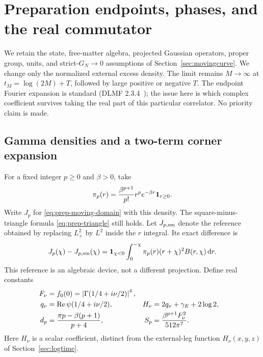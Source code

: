 \section{Preparation endpoints, phases, and the real commutator}
\label{sec:densityendpoints}
We retain the state, free-matter algebra, projected Gaussian operators,
proper group, units, and strict-$G_N\to0$ assumptions of
Section~\ref{sec:movingcurve}. We change only the normalized external
excess density. The limit remains $M\to\infty$ at
$t_M=\log(2M)+T$, followed by large positive or negative $T$.
The endpoint Fourier expansion is standard (DLMF 2.3.4~\cite{DLMF}); the issue here
is which complex coefficient survives taking the real part of this
particular correlator. No priority claim is made.

\subsection{Gamma densities and a two-term corner expansion}
For a fixed integer $p\ge0$ and $\beta>0$, take
\begin{equation}
 \pi_p(r)=\frac{\beta^{p+1}}{p!}r^pe^{-\beta r}\mathbf 1_{r\ge0}.
 \label{eq:dep-density}
\end{equation}
Write $J_p$ for \eqref{eq:prep-moving-domain} with this density.
The square-minus-triangle formula \eqref{eq:prep-triangle} still holds.
Let $J_{p,\rm sm}$ denote the reference obtained by replacing $L_+^2$
by $L^2$ inside the $r$ integral. Its exact difference is
\begin{equation}
 J_p(\chi)-J_{p,\rm sm}(\chi)
 =\mathbf 1_{\chi<0}\int_0^{-\chi}\pi_p(r)(r+\chi)^2 B(r,\chi)\mathop{}\!\mathrm d r.
 \label{eq:dep-difference}
\end{equation}
This reference is an algebraic device, not a different projection.
Define real constants
\begin{align}
 F_\nu&=f_0(0)=\left|\Gamma(1/4+i\nu/2)\right|^4,\notag\\
 q_\nu&=\operatorname{Re}\psi(1/4+i\nu/2),&
 H_\nu&=2q_\nu+\gamma_E+2\log2,\notag\\
 d_p&=\frac{\pi p-\beta(p+1)}{p+4},&
 S_p&=\frac{\beta^{p+1}F_\nu^2}{512\pi^7}.
 \label{eq:dep-coefficients}
\end{align}
Here $H_\nu$ is a scalar coefficient, distinct from the external-leg
function $H_\nu(x,y,z)$ of Section~\ref{sec:logtime}.

